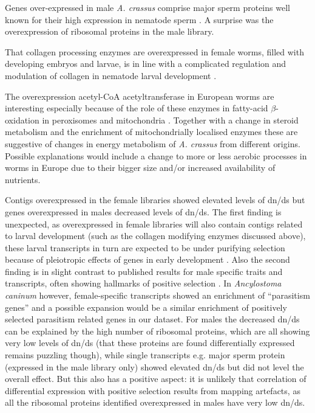 Genes over-expressed in male \textit{A. crassus} comprise major sperm
proteins well known for their high expression in nematode sperm
\cite{pmid15275275}. A surprise was the overexpression of ribosomal
proteins in the male library.

That collagen processing enzymes are overexpressed in female worms,
filled with developing embryos and larvae, is in line with a
complicated regulation and modulation of collagen in nematode larval
development \cite{pmid10637627}.

The overexpression acetyl-CoA acetyltransferase in European worms are
interesting especially because of the role of these enzymes in
fatty-acid $\beta$-oxidation in peroxisomes and mitochondria
\cite{pmid4721607}. Together with a change in steroid metabolism and
the enrichment of mitochondrially localised enzymes these are
suggestive of changes in energy metabolism of \textit{A. crassus} from
different origins. Possible explanations would include a change to
more or less aerobic processes in worms in Europe due to their bigger
size and/or increased availability of nutrients.

Contigs overexpressed in the female libraries showed elevated levels
of dn/ds but genes overexpressed in males decreased levels of
dn/ds. The first finding is unexpected, as overexpressed in female
libraries will also contain contigs related to larval development
(such as the collagen modifying enzymes discussed above), these larval
transcripts in turn are expected to be under purifying selection
because of pleiotropic effects of genes in early development
\cite{pmid15371532}. Also the second finding is in slight contrast to
published results for male specific traits and transcripts, often
showing hallmarks of positive selection
\cite{pmid15795858,pmid11404480}. In \textit{Ancylostoma caninum}
however, female-specific transcripts showed an enrichment of
``parasitism genes'' \cite{pmid20470405} and a possible expansion
would be a similar enrichment of positively selected parasitism
related genes in our dataset. For males the decreased dn/ds can be
explained by the high number of ribosomal proteins, which are all
showing very low levels of dn/ds (that these proteins are found
differentially expressed remains puzzling though), while single
transcripts e.g. major sperm protein (expressed in the male library
only) showed elevated dn/ds but did not level the overall effect. But
this also has a positive aspect: it is unlikely that correlation of
differential expression with positive selection results from mapping
artefacts, as all the ribosomal proteins identified overexpressed in
males have very low dn/ds.

